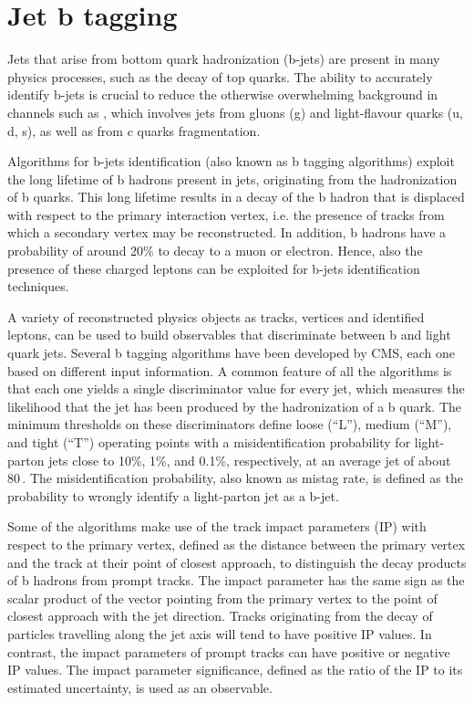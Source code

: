 \section{Jet b tagging}\label{sec:btag}

Jets that arise from bottom quark hadronization (b-jets) are present in many physics processes,
such as the decay of top quarks. The ability to accurately identify b-jets is crucial to reduce the otherwise overwhelming background in channels such as \hwwllnn, which involves jets from gluons (g) and light-flavour quarks (u, d, s), as well as from c quarks fragmentation.

Algorithms for b-jets identification (also known as b tagging algorithms) exploit the long lifetime of b hadrons present in jets, originating from the hadronization of b quarks. This long lifetime results in a decay of the b hadron that is displaced with respect to the primary interaction vertex, i.e. the presence of tracks from which a secondary vertex may be reconstructed. In addition, b hadrons have a probability of around 20\% to decay to a muon or electron. Hence, also the presence of these charged leptons can be exploited for b-jets identification techniques.

A variety of reconstructed physics objects as tracks, vertices and identified leptons, can be used to build observables that discriminate between b and light quark jets. Several b tagging algorithms have been developed by CMS, each one based on different input information. A common feature of all the algorithms is that each one yields a single discriminator value for every jet, which measures the likelihood that the jet has been produced by the hadronization of a b quark. The minimum thresholds on these discriminators define loose (``L''), medium (``M''), and tight (``T'') operating points with a misidentification probability for light-parton jets close to 10\%, 1\%, and 0.1\%, respectively, at an average jet \pt of about 80\,\GeV. The misidentification probability, also known as mistag rate, is defined as the probability to wrongly identify a light-parton jet as a b-jet.

Some of the algorithms make use of the track impact parameters (IP) with respect to the primary vertex, defined as the distance between the primary vertex and the track at their point of closest approach, to distinguish the decay products of b hadrons from prompt tracks. The impact parameter has the same sign as the scalar product of the vector pointing from the primary vertex to the point of closest approach with the jet direction. Tracks originating from the decay of particles travelling along the jet axis will tend to have positive IP values. In contrast, the impact parameters of prompt tracks can have positive or negative IP values. The impact parameter significance, defined as the ratio of the IP to its estimated uncertainty, is used as an observable.

